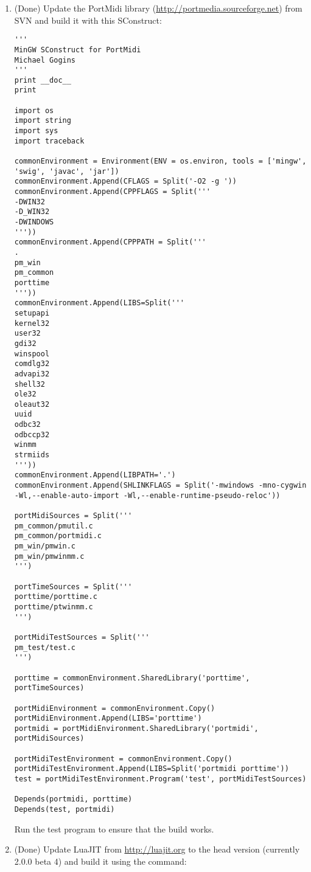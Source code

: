 \documentclass[11pt,letterpaper,onecolumn]{scrartcl}
\begin{document}
\begin{sloppypar}
\begin{enumerate}
\begin{enumerate}
\begin{lstlisting}
portAudio = commonEnvironment.SharedLibrary('portaudio', portAudioSources)
\end{lstlisting}

			\item (Done) Update the PortMidi library (\url{http://portmedia.sourceforge.net}) from SVN and build it with this SConstruct:
			
\begin{lstlisting}
'''
MinGW SConstruct for PortMidi
Michael Gogins
'''
print __doc__
print

import os
import string
import sys
import traceback

commonEnvironment = Environment(ENV = os.environ, tools = ['mingw', 'swig', 'javac', 'jar'])
commonEnvironment.Append(CFLAGS = Split('-O2 -g '))
commonEnvironment.Append(CPPFLAGS = Split('''
-DWIN32 
-D_WIN32 
-DWINDOWS 
'''))
commonEnvironment.Append(CPPPATH = Split('''
. 
pm_win
pm_common
porttime
'''))
commonEnvironment.Append(LIBS=Split('''
setupapi
kernel32
user32
gdi32
winspool
comdlg32
advapi32
shell32
ole32
oleaut32
uuid
odbc32
odbccp32
winmm
strmiids 
'''))
commonEnvironment.Append(LIBPATH='.')
commonEnvironment.Append(SHLINKFLAGS = Split('-mwindows -mno-cygwin -Wl,--enable-auto-import -Wl,--enable-runtime-pseudo-reloc'))

portMidiSources = Split('''
pm_common/pmutil.c
pm_common/portmidi.c
pm_win/pmwin.c
pm_win/pmwinmm.c
''')

portTimeSources = Split('''
porttime/porttime.c
porttime/ptwinmm.c
''')

portMidiTestSources = Split('''
pm_test/test.c
''')

porttime = commonEnvironment.SharedLibrary('porttime', portTimeSources)

portMidiEnvironment = commonEnvironment.Copy()
portMidiEnvironment.Append(LIBS='porttime')
portmidi = portMidiEnvironment.SharedLibrary('portmidi', portMidiSources)

portMidiTestEnvironment = commonEnvironment.Copy()
portMidiTestEnvironment.Append(LIBS=Split('portmidi porttime'))
test = portMidiTestEnvironment.Program('test', portMidiTestSources)

Depends(portmidi, porttime)
Depends(test, portmidi)
\end{lstlisting}

			Run the test program to ensure that the build works.
		  
		  \item (Done) Update LuaJIT from \url{http://luajit.org} to the head version (currently 2.0.0 beta 4) and build it using the command:
		  

\end{enumerate}
\end{enumerate}
\end{sloppypar}
\end{document}
